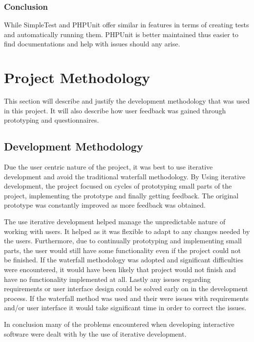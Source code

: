 \documentclass[a4paper,oneside,11pt]{report}
\begin{document}
\subsection{Conclusion}
While SimpleTest and PHPUnit offer similar in features in terms of creating tests and automatically running them. PHPUnit is better maintained thus easier to find documentations and help with issues should any arise. 


\chapter{Project Methodology}
This section will describe and justify the development methodology that was used in this project. It will also describe how user feedback was gained through prototyping and questionnaires.

\section{Development Methodology} 
Due the user centric nature of the project, it was best to use iterative development and avoid the traditional waterfall methodology. By Using iterative development, the project focused on cycles of prototyping small parts of the project, implementing the prototype and finally getting feedback. The original prototype was constantly improved as more feedback was obtained.

The use iterative development helped manage the unpredictable nature of working with users. It helped as it was flexible to adapt to any changes needed by the users. Furthermore, due to continually prototyping and implementing small parts, the user would still have some functionality even if the project could not be finished. If the waterfall methodology was adopted and significant difficulties were encountered, it would have been likely that project would not finish and have no functionality implemented at all. 
Lastly any issues regarding requirements or user interface design could be solved early on in the development process. If the waterfall method was used  and their were issues with requirements and/or user interface it would take significant time in order to correct the issues.

In conclusion many of the problems  encountered when developing interactive software were dealt with by the use of iterative development. 
\pagebreak
\end{document}
